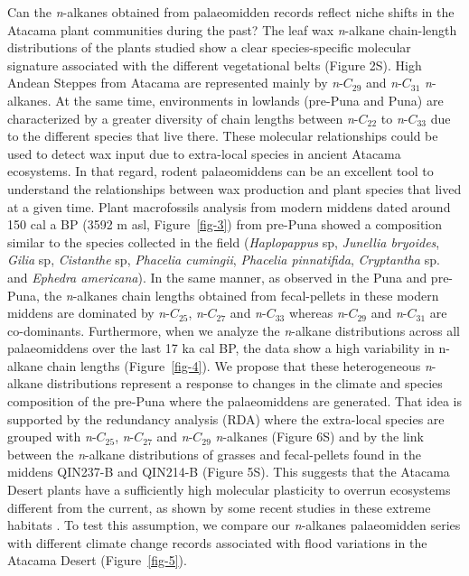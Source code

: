 \documentclass[
  authoryear,
  preprint,
  3p]{elsarticle}
\begin{document}
Can the \emph{n}-alkanes obtained from palaeomidden records reflect
niche shifts in the Atacama plant communities during the past? The leaf
wax \emph{n}-alkane chain-length distributions of the plants studied
show a clear species-specific molecular signature associated with the
different vegetational belts (Figure 2S). High Andean Steppes from
Atacama are represented mainly by \emph{n}-\(C_{29}\) and
\emph{n}-\(C_{31}\) \emph{n}-alkanes. At the same time, environments in
lowlands (pre-Puna and Puna) are characterized by a greater diversity of
chain lengths between \emph{n}-\(C_{22}\) to \emph{n}-\(C_{33}\) due to
the different species that live there. These molecular relationships
could be used to detect wax input due to extra-local species in ancient
Atacama ecosystems. In that regard, rodent palaeomiddens can be an
excellent tool to understand the relationships between wax production
and plant species that lived at a given time. Plant macrofossils
analysis from modern middens dated around 150 cal a BP (3592 m asl,
Figure~\ref{fig-3}) from pre-Puna showed a composition similar to the
species collected in the field (\emph{Haplopappus} sp, \emph{Junellia
bryoides}, \emph{Gilia} sp, \emph{Cistanthe} sp, \emph{Phacelia
cumingii}, \emph{Phacelia pinnatifida}, \emph{Cryptantha} sp. and
\emph{Ephedra americana}). In the same manner, as observed in the Puna
and pre-Puna, the \emph{n}-alkanes chain lengths obtained from
fecal-pellets in these modern middens are dominated by
\emph{n}-\(C_{25}\), \emph{n}-\(C_{27}\) and \emph{n}-\(C_{33}\) whereas
\emph{n}-\(C_{29}\) and \emph{n}-\(C_{31}\) are co-dominants.
Furthermore, when we analyze the \emph{n}-alkane distributions across
all palaeomiddens over the last 17 ka cal BP, the data show a high
variability in n-alkane chain lengths (Figure~\ref{fig-4}). We propose
that these heterogeneous \emph{n}-alkane distributions represent a
response to changes in the climate and species composition of the
pre-Puna where the palaeomiddens are generated. That idea is supported
by the redundancy analysis (RDA) where the extra-local species are
grouped with \emph{n}-\(C_{25}\), \emph{n}-\(C_{27}\) and
\emph{n}-\(C_{29}\) \emph{n}-alkanes (Figure 6S) and by the link between
the \emph{n}-alkane distributions of grasses and fecal-pellets found in
the middens QIN237-B and QIN214-B (Figure 5S). This suggests that the
Atacama Desert plants have a sufficiently high molecular plasticity to
overrun ecosystems different from the current, as shown by some recent
studies in these extreme habitats
\citep{diazMultiscaleClimateChange2019, eshelPlantEcologicalGenomics2021, dussarratPredictiveMetabolomicsMultiple2022}.
To test this assumption, we compare our \emph{n}-alkanes palaeomidden
series with different climate change records associated with flood
variations in the Atacama Desert (Figure~\ref{fig-5}).
\end{document}
